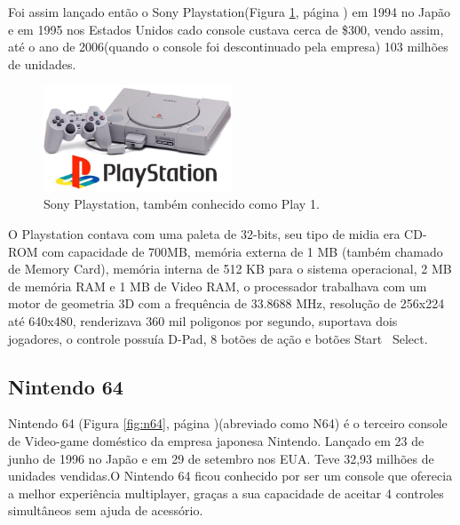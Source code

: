 \documentclass[12pt]{article}
\begin{document}
Foi assim lançado ent\~{a}o o Sony Playstation(Figura \ref{fig:play1}, página \pageref{fig:play1}) em 1994 no Jap\~{a}o e em 1995 nos Estados Unidos cado console custava cerca de \$300, vendo assim, até o ano de 2006(quando o console foi descontinuado pela empresa) 103 milh\~{o}es de unidades.


\begin{figure}[!htb]
    \centering
    \includegraphics[width=0.5\textwidth]{play1.jpg}
    \caption{Sony Playstation, também conhecido como Play 1.}
    \label{fig:play1}
\end{figure}

O Playstation contava com uma paleta de 32-bits, seu tipo de midia era CD-ROM com capacidade de 700MB, memória externa de 1 MB (também chamado de Memory Card), memória interna de 512 KB para o sistema operacional, 2 MB de memória RAM e 1 MB de Video RAM,  o processador trabalhava com um motor de geometria 3D com a frequência de 33.8688 MHz, resoluç\~{a}o de 256x224 até 640x480, renderizava 360 mil poligonos por segundo, suportava dois jogadores, o controle possuía D-Pad, 8 bot\~{o}es de aç\~{a}o e bot\~{o}es Start \ Select.
\linebreak

\subsection{Nintendo 64}
Nintendo 64 (Figura \ref{fig:n64}, página \pageref{fig:n64})(abreviado como N64) é o terceiro console de Video-game doméstico da empresa japonesa Nintendo. Lançado em 23 de junho de 1996 no Japão e em 29 de setembro nos EUA. Teve 32,93 milhões de unidades vendidas.O Nintendo 64 ficou conhecido por ser um console que oferecia a melhor experiência multiplayer, graças a sua capacidade de aceitar 4 controles simultâneos sem ajuda de acessório.
\end{document}
